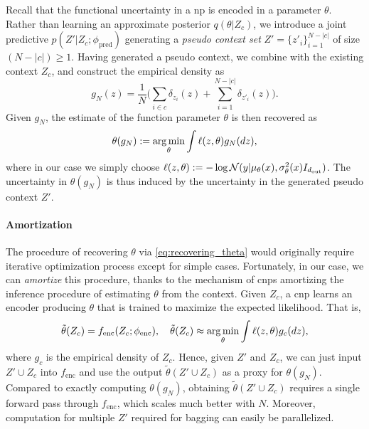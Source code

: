 Recall that the functional uncertainty in a \gls{np} is encoded in a parameter $\theta$. Rather than learning an approximate posterior $q(\theta|Z_c)$, we introduce a joint predictive $p(Z'|Z_c ; \phi_\text{pred})$ generating a \emph{pseudo context set} $Z' = \{z'_i\}_{i=1}^{N-|c|}$ of size $(N-|c|) \geq 1$. 
Having generated a pseudo context, we combine with the existing context $Z_c$, and construct the empirical density as
\[
g_N(z) = \frac{1}{N}\bigg(\sum_{i\in c}\delta_{z_i}(z) + \sum_{i=1}^{N-|c|} \delta_{z'_i}(z)\bigg).
\]
Given $g_N$, the estimate of the function parameter $\theta$ is then recovered as 
\[
\label{eq:recovering_theta}
\theta(g_N) := \operatorname*{arg\,min}_\theta \int \ell(z, \theta) g_N(dz),
\]
where in our case we simply choose $\ell(z,\theta) := -\log {\mathcal{N}}(y|\mu_\theta(x), \sigma^2_\theta(x)I_{d_{\text{out}}})$. The uncertainty in $\theta(g_N)$ is thus induced by the uncertainty in the generated pseudo context $Z'$.

\paragraph{Amortization}
The procedure of recovering $\theta$ via \cref{eq:recovering_theta} would originally require iterative optimization process except for simple cases. Fortunately, in our case, we can \emph{amortize} this procedure, thanks to the mechanism of \glspl{cnp} amortizing the inference procedure of estimating $\theta$ from the context. Given $Z_c$, a \gls{cnp} learns an encoder producing $\theta$ that is trained to maximize the expected likelihood. That is,
\[
 \tilde\theta(Z_c) = f_\text{enc}(Z_c;\phi_\text{enc}), \quad \tilde\theta(Z_c) \approx \operatorname*{arg\,min}_{\theta} \int \ell(z,\theta) g_c(dz),
\]
where $g_c$ is the empirical density of $Z_c$. Hence, given $Z'$ and $Z_c$, we can just input $Z'\cup Z_c$ into $f_\text{enc}$ and use the output $\tilde\theta(Z'\cup Z_c)$ as a proxy for $\theta(g_N)$. Compared to exactly computing $\theta(g_N)$, obtaining $\tilde\theta(Z'\cup Z_c)$ requires a single forward pass through $f_\text{enc}$, which scales much better with $N$. Moreover, computation for multiple $Z'$ required for bagging can easily be parallelized. 

